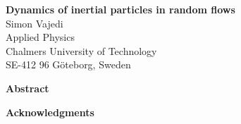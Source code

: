 \documentclass[a4paper,11pt,twoside,openright]{UGthesis}
\newcommand\ffam{\sffamily}
\newcommand\fser{\bfseries}
\newcommand\fsh{\upshape}
\newcommand\blankpage{\thispagestyle{empty}\mbox{}\newpage}
\newcommand{\titel}{Dynamics of inertial particles in random flows}
\begin{document}
%
%

\mbox{}\thispagestyle{empty}\newpage
\vspace*{165mm}


\blankpage

%
%

\thispagestyle{empty}
\begin{center}
        {\ffam 
        {\fser\Large \titel}\\
\vspace{3mm}
        {\normalsize Simon Vajedi  \\
        Applied Physics \\
        Chalmers University of Technology\\
        SE-412 96 Göteborg, Sweden} \\[7mm]}
\end{center}

\centerline{\ffam\fser Abstract}
\medskip
\normalsize
\noindent

\vfill

\newpage

%
%
\thispagestyle{plain}
\vspace*{4cm}

\centerline{\ffam\fser\Large Acknowledgments}
\medskip
\smallskip

\normalsize
\noindent 

%
%
\cleardoublepage
\tableofcontents
\pagestyle{empty}

\cleardoublepage
\pagestyle{fancy}
\renewcommand{\chaptermark}[1]{\markboth{Chapter \thechapter\ \ \ #1}{#1}}
\renewcommand{\sectionmark}[1]{\markright{\thesection\ \ #1}}
\lhead[\fancyplain{}{\sffamily\thepage}]%
  {\fancyplain{}{\sffamily\rightmark}}
\rhead[\fancyplain{}{\sffamily\leftmark}]%
  {\fancyplain{}{\sffamily\thepage}}
\cfoot{}
\setlength\headheight{14pt}
\end{document}
